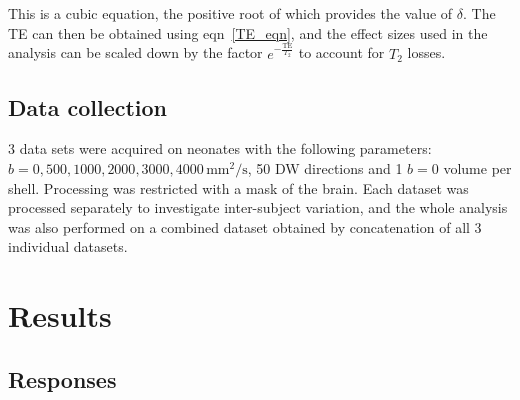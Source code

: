 \documentclass{article}
\newcommand{\mms}{\textrm{mm}^2/\textrm{s}}
\begin{document}
This is a cubic equation, the positive root of which provides the value of
$\delta$. The TE can then be obtained using eqn~\ref{TE_eqn}, and the effect
sizes used in the analysis can be scaled down by the factor
$e^{-\frac{\textrm{TE}}{T_2}}$ to account for $T_2$ losses.


\subsection{Data collection}

3 data sets were acquired on neonates with the following parameters: $b = 0,
500, 1000, 2000, 3000, 4000 \, \mms$, 50 DW directions and 1 $b=0$ volume per
shell. Processing was restricted with a mask of the brain. Each dataset was
processed separately to investigate inter-subject variation, and the whole
analysis was also performed on a combined dataset obtained by concatenation of
all 3 individual datasets.


\section{Results}

\subsection{Responses}
\end{document}
